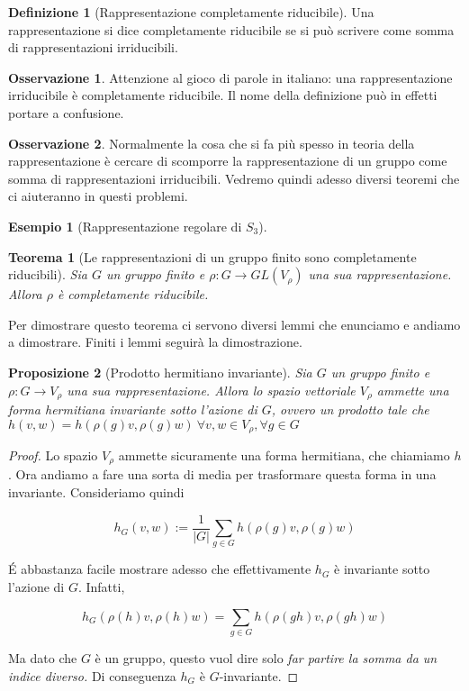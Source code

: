 \documentclass[11pt]{article}
\theoremstyle{plain}
\newtheorem{thm}{Teorema}[section]
\newtheorem{prop}[thm]{Proposizione}
\theoremstyle{definition}
\newtheorem{defn}{Definizione}[section]
\newtheorem{exmp}{Esempio}[section]
\newtheorem*{rem}{Osservazione}
\theoremstyle{remark}
\newcommand{\dsum}{\displaystyle\sum}
\begin{document}
\begin{defn}[Rappresentazione completamente riducibile]
Una rappresentazione si dice completamente riducibile se si può scrivere come somma di rappresentazioni irriducibili.
\end{defn}


\begin{rem}
Attenzione al gioco di parole in italiano: una rappresentazione irriducibile è completamente riducibile. Il nome della definizione può in effetti portare a confusione.
\end{rem}


\begin{rem} Normalmente la cosa che si fa più spesso in teoria della rappresentazione è cercare di scomporre la rappresentazione di un gruppo come somma di rappresentazioni irriducibili. Vedremo quindi adesso diversi teoremi che ci aiuteranno in questi problemi.

\end{rem}



\begin{exmp}[Rappresentazione regolare di $S_3$]


\end{exmp}



\begin{thm}[Le rappresentazioni di un gruppo finito sono completamente riducibili]
  Sia $G$ un gruppo finito e $\rho: G \to GL(V_\rho)$ una sua rappresentazione. Allora $\rho$ è completamente riducibile.
  \label{thm:gruppo finito completamente riducibile}
\end{thm}
Per dimostrare questo teorema ci servono diversi lemmi che enunciamo e andiamo a dimostrare. Finiti i lemmi seguirà la dimostrazione.


\begin{prop}[Prodotto hermitiano invariante] Sia $G$ un gruppo finito e $\rho: G \to V_\rho$ una sua rappresentazione. Allora lo spazio vettoriale $V_\rho$ ammette una forma hermitiana invariante sotto l'azione di $G$, ovvero un prodotto tale che $h(v,w) = h(\rho(g) v, \rho(g) w) \ \forall v,w\in V_\rho, \forall g \in G$
\label{thm:esistenza hermitiana}
\end{prop}

\begin{proof}

Lo spazio $V_\rho$ ammette sicuramente una forma hermitiana, che chiamiamo $h$. Ora andiamo a fare una sorta di media per trasformare questa forma in una invariante. Consideriamo quindi

\[h_G(v, w) := \dfrac{1}{|G|} \dsum_{g \in G} h(\rho(g)v,\rho(g) w) \]

\'E abbastanza facile mostrare adesso che effettivamente $h_G$ è invariante sotto l'azione di $G$. Infatti,

\[ h_G(\rho(h)v, \rho(h) w) = \dsum_{g \in G} h(\rho(gh)v , \rho(gh) w)\]

Ma dato che $G$ è un gruppo, questo vuol dire solo \emph{far partire la somma da un indice diverso.} Di conseguenza $h_G$ è $G$-invariante.

\end{proof}
\end{document}
